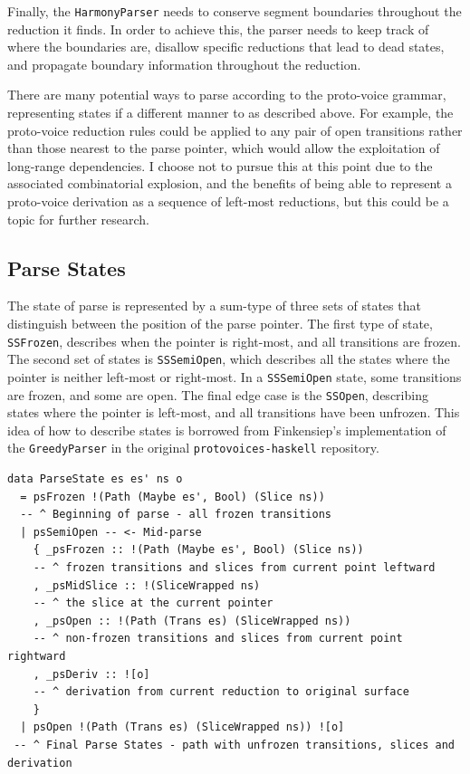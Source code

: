 \documentclass[12pt,a4paper,twoside,openany]{report} \usepackage[pdfborder={0 0 0}]{hyperref}    %
\theoremstyle{definition} \newtheorem{definition}{Definition}[section]
\begin{document}
      Finally, the \texttt{HarmonyParser} needs to conserve segment boundaries throughout the reduction it finds.
      In order to achieve this, the parser needs to keep track of where the boundaries are, disallow specific
      reductions that lead to dead states, and propagate boundary information throughout the reduction. 

      There are many potential ways to parse according to the proto-voice grammar, representing states if
      a different manner to as described above. For example, the proto-voice reduction rules could be applied
      to any pair of open transitions rather than those nearest to the parse pointer, which would allow the
      exploitation of long-range dependencies. I choose not to pursue this at this point due to the associated
      combinatorial explosion, and the benefits of being able to represent a proto-voice derivation as a sequence
      of left-most reductions, but this could be a topic for further research.
      
      \subsection{Parse States}

      The state of parse is represented by a sum-type of three sets of states that distinguish between the position
      of the parse pointer. The first type of state, \texttt{SSFrozen}, describes when the pointer is right-most,
      and all transitions are frozen. The second set of states is \texttt{SSSemiOpen}, which describes all the
      states where the pointer is neither left-most or right-most. In a \texttt{SSSemiOpen} state, some
      transitions are frozen, and some are open. The final edge case is the \texttt{SSOpen}, describing states
      where the pointer is left-most, and all transitions have been unfrozen. This idea of how to describe states is borrowed from Finkensiep's implementation of the \texttt{GreedyParser} in the original \texttt{protovoices-haskell} repository.


    \begin{lstlisting}[caption={Harmony Parser States}, captionpos=b] 
data ParseState es es' ns o 
  = psFrozen !(Path (Maybe es', Bool) (Slice ns)) 
  -- ^ Beginning of parse - all frozen transitions
  | psSemiOpen -- <- Mid-parse 
    { _psFrozen :: !(Path (Maybe es', Bool) (Slice ns)) 
    -- ^ frozen transitions and slices from current point leftward 
    , _psMidSlice :: !(SliceWrapped ns) 
    -- ^ the slice at the current pointer
    , _psOpen :: !(Path (Trans es) (SliceWrapped ns)) 
    -- ^ non-frozen transitions and slices from current point rightward 
    , _psDeriv :: ![o] 
    -- ^ derivation from current reduction to original surface 
    } 
  | psOpen !(Path (Trans es) (SliceWrapped ns)) ![o] 
 -- ^ Final Parse States - path with unfrozen transitions, slices and derivation
    \end{lstlisting}
\end{document}
